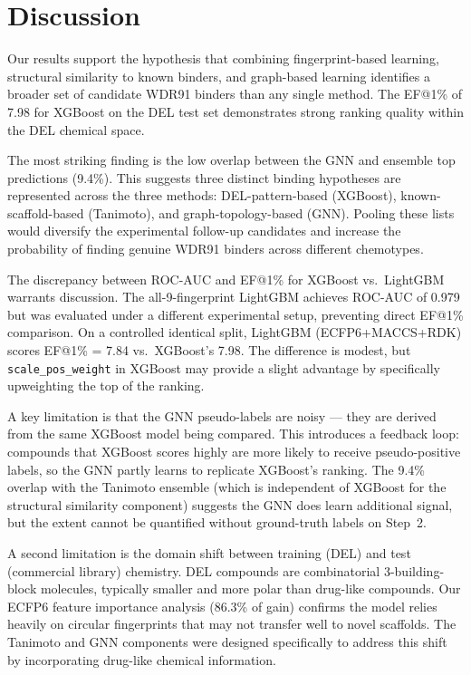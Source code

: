 \documentclass[10pt, letterpaper]{article}
\begin{document}
\section{Discussion}
Our results support the hypothesis that combining fingerprint-based learning, structural similarity to known binders, and graph-based learning identifies a broader set of candidate WDR91 binders than any single method. The EF@1\% of 7.98 for XGBoost on the DEL test set demonstrates strong ranking quality within the DEL chemical space.

The most striking finding is the low overlap between the GNN and ensemble top predictions (9.4\%). This suggests three distinct binding hypotheses are represented across the three methods: DEL-pattern-based (XGBoost), known-scaffold-based (Tanimoto), and graph-topology-based (GNN). Pooling these lists would diversify the experimental follow-up candidates and increase the probability of finding genuine WDR91 binders across different chemotypes.

The discrepancy between ROC-AUC and EF@1\% for XGBoost vs.\ LightGBM warrants discussion. The all-9-fingerprint LightGBM achieves ROC-AUC of 0.979 but was evaluated under a different experimental setup, preventing direct EF@1\% comparison. On a controlled identical split, LightGBM (ECFP6+MACCS+RDK) scores EF@1\% = 7.84 vs.\ XGBoost's 7.98. The difference is modest, but \texttt{scale\_pos\_weight} in XGBoost may provide a slight advantage by specifically upweighting the top of the ranking.

A key limitation is that the GNN pseudo-labels are noisy — they are derived from the same XGBoost model being compared. This introduces a feedback loop: compounds that XGBoost scores highly are more likely to receive pseudo-positive labels, so the GNN partly learns to replicate XGBoost's ranking. The 9.4\% overlap with the Tanimoto ensemble (which is independent of XGBoost for the structural similarity component) suggests the GNN does learn additional signal, but the extent cannot be quantified without ground-truth labels on Step~2.

A second limitation is the domain shift between training (DEL) and test (commercial library) chemistry. DEL compounds are combinatorial 3-building-block molecules, typically smaller and more polar than drug-like compounds. Our ECFP6 feature importance analysis (86.3\% of gain) confirms the model relies heavily on circular fingerprints that may not transfer well to novel scaffolds. The Tanimoto and GNN components were designed specifically to address this shift by incorporating drug-like chemical information.
\end{document}
